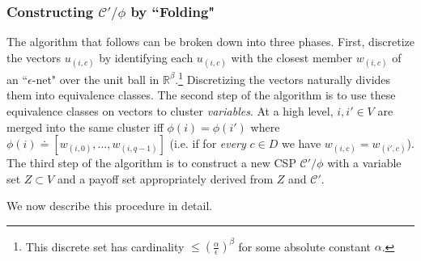 \documentclass[letterpaper, 12pt]{article}
\numberwithin{equation}{section}
\begin{document}
\subsubsection{Constructing $\mathcal{C}'/\phi$ by ``Folding"}

The algorithm that follows can be broken down into three phases. First, discretize the vectors $u_{(i,c)}$ by identifying each $u_{(i,c)}$ with the closest member $w_{(i,c)}$ of an ``$\epsilon$-net" over the unit ball in $\mathbb{R}^\beta$.\footnote{This discrete set has cardinality $\leq \left(\frac{\alpha}{\epsilon}\right)^{\beta}$ for some absolute constant $\alpha$.} 
Discretizing the vectors naturally divides them into equivalence classes. The second step of the algorithm is to use these equivalence classes on vectors to cluster \textit{variables}. 
At a high level, $i,i' \in V$ are merged into the same cluster iff $\phi(i) = \phi(i')$ where $\phi(i) \doteq [w_{(i,0)},\ldots,w_{(i,q-1)}]$ (i.e. if for \textit{ every } $c\in D$ we have $w_{(i,c)} = w_{(i',c)}$). 
The third step of the algorithm is to construct a new CSP $\mathcal{C}'/\phi$ with a variable set $Z \subset V$ and a payoff set appropriately derived from $Z$ and $\mathcal{C}'$.

We now describe this procedure in detail.
\end{document}
